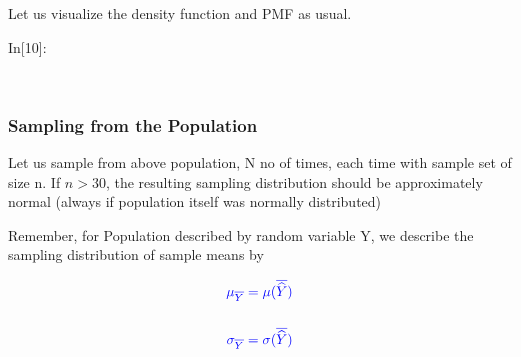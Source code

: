 \documentclass[float=false,crop=false]{standalone}
\begin{document}
    Let us visualize the density function and PMF as usual.
\begin{InVerbatim}[commandchars=\\\{\},fontsize=\scriptsize]
{\color{incolor}In[{\color{incolor}10}]:}    
         
            
              
\end{InVerbatim}
    \begin{center}
    \end{center}
    { \hspace*{\fill} \\}
    
    \subsubsection{Sampling from the
Population}\label{sampling-from-the-population}

Let us sample from above population, N no of times, each time with
sample set of size n. If \(n > 30\), the resulting sampling distribution
should be approximately normal (always if population itself was normally
distributed)

Remember, for Population described by random variable Y, we describe the
sampling distribution of sample means by

\begin{equation}
\color {blue}{
\begin{aligned}
\mu_{\overline{Y}} = \mu(\overline{\widehat{Y}}) \\ \\
\sigma_{\overline{Y}} = \sigma(\overline{\widehat{Y}})
\end{aligned}
}
\end{equation}
\end{document}
